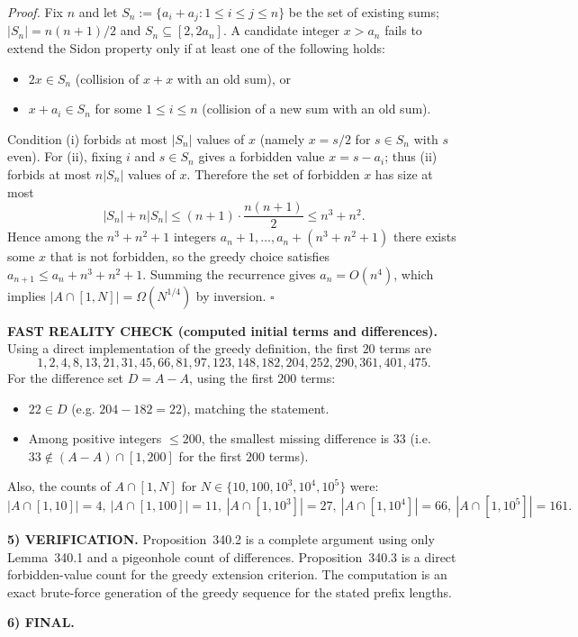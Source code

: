 \noindent\emph{Proof.}
Fix $n$ and let $S_n:=\{a_i+a_j:1\le i\le j\le n\}$ be the set of existing sums; $|S_n|=n(n+1)/2$ and $S_n\subseteq[2,2a_n]$.
A candidate integer $x>a_n$ fails to extend the Sidon property only if at least one of the following holds:
\begin{itemize}
\item[(i)] $2x\in S_n$ (collision of $x+x$ with an old sum), or
\item[(ii)] $x+a_i\in S_n$ for some $1\le i\le n$ (collision of a new sum with an old sum).
\end{itemize}
Condition (i) forbids at most $|S_n|$ values of $x$ (namely $x=s/2$ for $s\in S_n$ with $s$ even).
For (ii), fixing $i$ and $s\in S_n$ gives a forbidden value $x=s-a_i$; thus (ii) forbids at most $n|S_n|$ values of $x$.
Therefore the set of forbidden $x$ has size at most
\[
 |S_n| + n|S_n| \le (n+1)\cdot \frac{n(n+1)}{2} \le n^3+n^2.
\]
Hence among the $n^3+n^2+1$ integers $a_n+1,\dots,a_n+(n^3+n^2+1)$ there exists some $x$ that is not forbidden, so the greedy choice satisfies $a_{n+1}\le a_n+n^3+n^2+1$.
Summing the recurrence gives $a_n=O(n^4)$, which implies $|A\cap[1,N]|=\Omega(N^{1/4})$ by inversion.
\hfill$\square$

\medskip
\noindent\textbf{FAST REALITY CHECK (computed initial terms and differences).}
Using a direct implementation of the greedy definition, the first $20$ terms are
\[
1,2,4,8,13,21,31,45,66,81,97,123,148,182,204,252,290,361,401,475.
\]
For the difference set $D=A-A$, using the first $200$ terms:
\begin{itemize}
\item $22\in D$ (e.g. $204-182=22$), matching the statement.
\item Among positive integers $\le 200$, the smallest missing difference is $33$ (i.e. $33\notin (A-A)\cap[1,200]$ for the first $200$ terms).
\end{itemize}
Also, the counts of $A\cap[1,N]$ for $N\in\{10,100,10^3,10^4,10^5\}$ were:
\[
|A\cap[1,10]|=4,\ |A\cap[1,100]|=11,\ |A\cap[1,10^3]|=27,\ |A\cap[1,10^4]|=66,\ |A\cap[1,10^5]|=161.
\]

\medskip
\noindent\textbf{5) VERIFICATION.}
Proposition~340.2 is a complete argument using only Lemma~340.1 and a pigeonhole count of differences.
Proposition~340.3 is a direct forbidden-value count for the greedy extension criterion.
The computation is an exact brute-force generation of the greedy sequence for the stated prefix lengths.

\medskip
\noindent\textbf{6) FINAL.}

